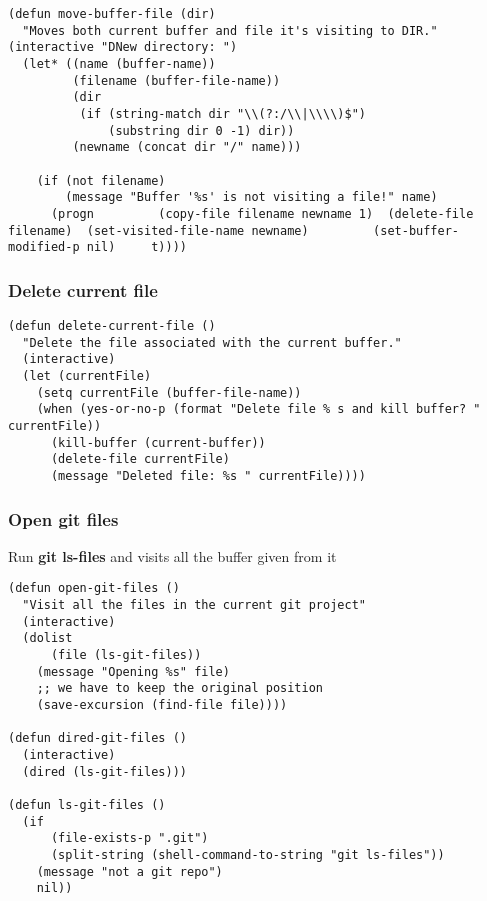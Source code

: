 \documentclass[11pt]{article}
\begin{document}
\begin{verbatim}
(defun move-buffer-file (dir)
  "Moves both current buffer and file it's visiting to DIR." (interactive "DNew directory: ")
  (let* ((name (buffer-name))
         (filename (buffer-file-name))
         (dir
          (if (string-match dir "\\(?:/\\|\\\\)$")
              (substring dir 0 -1) dir))
         (newname (concat dir "/" name)))

    (if (not filename)
        (message "Buffer '%s' is not visiting a file!" name)
      (progn         (copy-file filename newname 1)  (delete-file filename)  (set-visited-file-name newname)         (set-buffer-modified-p nil)     t))))
\end{verbatim}
\subsubsection{Delete current file}
\label{sec-18.2.10}

\begin{verbatim}
(defun delete-current-file () 
  "Delete the file associated with the current buffer." 
  (interactive) 
  (let (currentFile) 
    (setq currentFile (buffer-file-name)) 
    (when (yes-or-no-p (format "Delete file % s and kill buffer? " currentFile)) 
      (kill-buffer (current-buffer)) 
      (delete-file currentFile) 
      (message "Deleted file: %s " currentFile))))
\end{verbatim}
\subsubsection{Open git files}
\label{sec-18.2.11}

    Run \textbf{git ls-files} and visits all the buffer given from it

\begin{verbatim}
(defun open-git-files ()
  "Visit all the files in the current git project"
  (interactive)
  (dolist
      (file (ls-git-files))
    (message "Opening %s" file)
    ;; we have to keep the original position
    (save-excursion (find-file file))))

(defun dired-git-files ()
  (interactive)
  (dired (ls-git-files)))

(defun ls-git-files ()
  (if
      (file-exists-p ".git")
      (split-string (shell-command-to-string "git ls-files"))
    (message "not a git repo")
    nil))
\end{verbatim}
\end{document}
